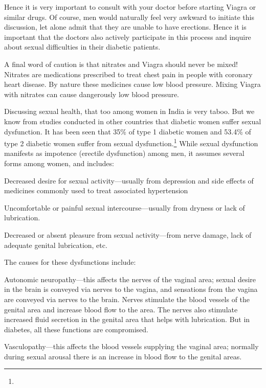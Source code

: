 {Hence it is very important to consult with your doctor before starting Viagra or similar drugs. Of course, men would naturally feel very awkward to initiate this discussion, let alone admit that they are unable to have erections. Hence it is important that the doctors also actively participate in this process and inquire about sexual difficulties in their diabetic patients.

A final word of caution is that nitrates and Viagra should never be mixed! Nitrates are medications prescribed to treat chest pain in people with coronary heart disease. By nature these medicines cause low blood pressure. Mixing Viagra with nitrates can cause dangerously low blood pressure.


Discussing sexual health, that too among women in India is very taboo. But we know from studies conducted in other countries that diabetic women suffer sexual dysfunction. It has been seen that 35\% of type 1 diabetic women and 53.4\% of type 2 diabetic women suffer from sexual dysfunction.\footnote{} While sexual dysfunction manifests as impotence (erectile dysfunction) among men, it assumes several forms among women, and includes:

\item Decreased desire for sexual activity—usually from depression and side effects of medicines commonly used to treat associated hypertension

 \item Uncomfortable or painful sexual intercourse—usually from dryness or lack of lubrication.

 \item Decreased or absent pleasure from sexual activity—from nerve damage, lack of adequate genital lubrication, etc.

The causes for these dysfunctions include:

\item Autonomic neuropathy—this affects the nerves of the vaginal area; sexual desire in the brain is conveyed via nerves to the vagina, and sensations from the vagina are conveyed via nerves to the brain. Nerves stimulate the blood vessels of the genital area and increase blood flow to the area. The nerves also stimulate increased fluid secretion in the genital area that helps with lubrication. But in diabetes, all these functions are compromised.

 \item Vasculopathy—this affects the blood vessels supplying the vaginal area; normally during sexual arousal there is an increase in blood flow to the genital areas.

}
